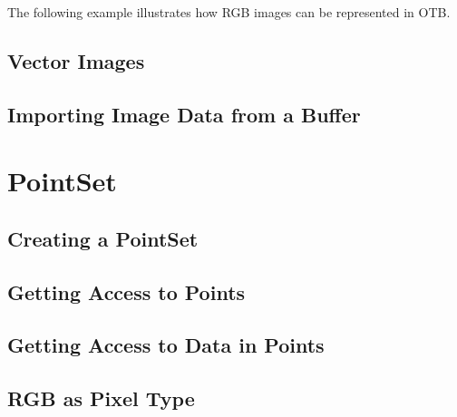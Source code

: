 The following example illustrates how RGB images can be represented in OTB.

\label{sec:DefiningRGBImages}



\subsection{Vector Images}
\label{sec:DefiningVectorImages}




\subsection{Importing Image Data from a Buffer}
\label{sec:ImportingImageDataFromABuffer}
%



\section{PointSet}
\label{PointSetSection}

\subsection{Creating a PointSet}
\label{sec:CreatingAPointSet}

%



\subsection{Getting Access to Points}
\label{sec:GettingAccessToPointsInThePointSet}

%



\subsection{Getting Access to Data in Points}
\label{sec:GettingAccessToDataInThePointSet}

%



\subsection{RGB as Pixel Type}
\label{sec:PointSetWithRGBAsPixelType}

%




